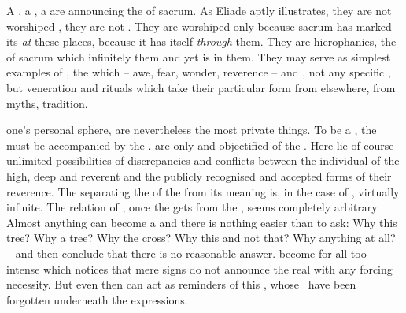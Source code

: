 A , a , a  are 
announcing the  of sacrum. As Eliade aptly illustrates, they are
not worshiped , they are not . They
are worshiped only because sacrum has marked its  {\em at} these
places, because it has  itself {\em through} them. They are
hierophanies, the  of sacrum which infinitely  them and
yet is  in them.  They may serve as simplest examples of
, the  which  -- awe,
fear, wonder, reverence -- and , not any specific , but
veneration and rituals which take their particular form from elsewhere, from
myths, tradition.


\pa {} {one's} personal sphere,  are nevertheless the
most private things. To be a , the  must be
accompanied by the .  are only
 and {objectified}  of the \oss.  Here lie of
course unlimited possibilities of discrepancies and conflicts between the
individual  of the high, deep and reverent and the publicly
recognised  and accepted forms of their reverence.  The
 separating the  of the  from its meaning
is, in the case of , virtually infinite.  The relation of
, once the  gets  from the \oss,
seems completely arbitrary. Almost anything can become a  and there
is nothing easier than to ask: Why this tree? Why a tree?  Why the cross? Why
this and not that? Why anything at all? -- and then conclude that there is no
reasonable answer.  become  for all too intense
 which notices that mere signs do not announce the real
 with any forcing necessity. But even then  can act as
reminders of this , whose \oss\ have been forgotten underneath the
 expressions. 

